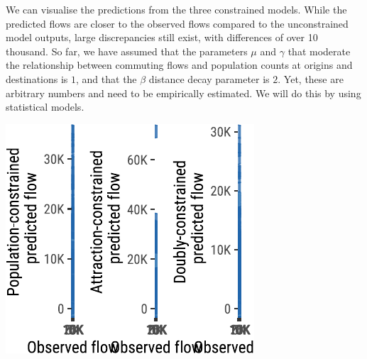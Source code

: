 \documentclass[
  a4paper, 
  twoside,
  final
]{article}
\newenvironment{Shaded}{\begin{snugshade}}{\end{snugshade}}
\newcommand{\AttributeTok}[1]{\textcolor[rgb]{0.40,0.45,0.13}{#1}}
\newcommand{\CommentTok}[1]{\textcolor[rgb]{0.37,0.37,0.37}{#1}}
\newcommand{\ConstantTok}[1]{\textcolor[rgb]{0.56,0.35,0.01}{#1}}
\newcommand{\ControlFlowTok}[1]{\textcolor[rgb]{0.00,0.23,0.31}{#1}}
\newcommand{\DecValTok}[1]{\textcolor[rgb]{0.68,0.00,0.00}{#1}}
\newcommand{\FunctionTok}[1]{\textcolor[rgb]{0.28,0.35,0.67}{#1}}
\newcommand{\NormalTok}[1]{\textcolor[rgb]{0.00,0.23,0.31}{#1}}
\newcommand{\OtherTok}[1]{\textcolor[rgb]{0.00,0.23,0.31}{#1}}
\newcommand{\SpecialCharTok}[1]{\textcolor[rgb]{0.37,0.37,0.37}{#1}}
\newcounter{code}
\begin{document}
\begin{Shaded}
\end{Shaded}

We can visualise the predictions from the three constrained models.
While the predicted flows are closer to the observed flows compared to
the unconstrained model outputs, large discrepancies still exist, with
differences of over 10 thousand. So far, we have assumed that the
parameters \(\mu\) and \(\gamma\) that moderate the relationship between
commuting flows and population counts at origins and destinations is
\(1\), and that the \(\beta\) distance decay parameter is \(2\). Yet,
these are arbitrary numbers and need to be empirically estimated. We
will do this by using statistical models.

\includegraphics{region-quarto-template_files/figure-pdf/unnamed-chunk-9-1.pdf}
\end{document}
